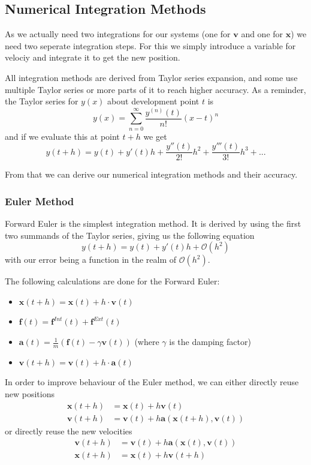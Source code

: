 \documentclass{article}
\begin{document}
\subsection{Numerical Integration Methods}
As we actually need two integrations for our systems (one for $\bm{v}$ and one for $\bm{x}$) we need two seperate integration steps.
For this we simply introduce a variable for velociy and integrate it to get the new position.

All integration methods are derived from Taylor series expansion, and some use multiple Taylor series or more parts of it to reach higher accuracy.
As a reminder, the Taylor series for $y(x)$ about development point $t$ is
\begin{equation}
    y(x) = \sum_{n=0}^\infty \frac{y^{(n)}(t)}{n!} (x-t)^n
\end{equation}
and if we evaluate this at point $t+h$ we get
\begin{equation}
    \label{eq:taylor}
    y(t+h) = y(t) + y'(t)h+\frac{y''(t)}{2!}h^2 + \frac{y'''(t)}{3!}h^3+...
\end{equation}

From that we can derive our numerical integration methods and their accuracy.

\subsubsection{Euler Method}
Forward Euler is the simplest integration method.
It is derived by using the first two summands of the Taylor series, giving us the following equation
\begin{equation}
    y(t+h) = y(t) + y'(t)h + \mathcal{O}(h^2)
\end{equation}
with our error being a function in the realm of $\mathcal{O}(h^2)$.

The following calculations are done for the Forward Euler:
\begin{itemize}
    \item $\bm{x}(t+h) = \bm{x}(t) + h\cdot \bm{v}(t)$
    \item $\bm{f}(t) = \bm{f}^{Int}(t) + \bm{f}^{Ext}(t)$
    \item $\bm{a}(t) = \frac{1}{m}(\bm{f}(t)-\gamma \bm{v}(t))$ (where $\gamma$ is the damping factor)
    \item $\bm{v}(t+h) = \bm{v}(t) + h \cdot \bm{a}(t)$
\end{itemize}

In order to improve behaviour of the Euler method, we can either directly reuse new positions
\begin{align}
    \bm{x}(t+h) &= \bm{x}(t) + h \bm{v}(t)\\
    \bm{v}(t+h) &= \bm{v}(t) + h \bm{a}(\bm{x}(t+h), \bm{v}(t))
\end{align}
or directly reuse the new velocities
\begin{align}
    \bm{v}(t+h) &= \bm{v}(t) + h \bm{a}(\bm{x}(t), \bm{v}(t))\\
    \bm{x}(t+h) &= \bm{x}(t) + h \bm{v}(t+h)
\end{align}
\end{document}
